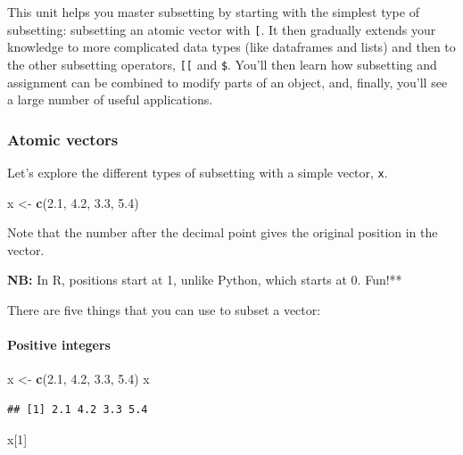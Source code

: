 \documentclass[
]{book}
\newenvironment{Shaded}{\begin{snugshade}}{\end{snugshade}}
\newcommand{\DecValTok}[1]{\textcolor[rgb]{0.00,0.00,0.81}{#1}}
\newcommand{\FloatTok}[1]{\textcolor[rgb]{0.00,0.00,0.81}{#1}}
\newcommand{\FunctionTok}[1]{\textcolor[rgb]{0.13,0.29,0.53}{\textbf{#1}}}
\newcommand{\NormalTok}[1]{#1}
\newcommand{\OtherTok}[1]{\textcolor[rgb]{0.56,0.35,0.01}{#1}}
\begin{document}
This unit helps you master subsetting by starting with the simplest type of subsetting: subsetting an atomic vector with \texttt{{[}}. It then gradually extends your knowledge to more complicated data types (like dataframes and lists) and then to the other subsetting operators, \texttt{{[}{[}} and \texttt{\$}. You'll then learn how subsetting and assignment can be combined to modify parts of an object, and, finally, you'll see a large number of useful applications.

\subsubsection{Atomic vectors}\label{atomic-vectors}

Let's explore the different types of subsetting with a simple vector, \texttt{x}.

\begin{Shaded}
\begin{Highlighting}[]
\NormalTok{x }\OtherTok{\textless{}{-}} \FunctionTok{c}\NormalTok{(}\FloatTok{2.1}\NormalTok{, }\FloatTok{4.2}\NormalTok{, }\FloatTok{3.3}\NormalTok{, }\FloatTok{5.4}\NormalTok{)}
\end{Highlighting}
\end{Shaded}

Note that the number after the decimal point gives the original position in the vector.

\textbf{NB:} In R, positions start at 1, unlike Python, which starts at 0. Fun!**

There are five things that you can use to subset a vector:

\paragraph{Positive integers}\label{positive-integers}

\begin{Shaded}
\begin{Highlighting}[]
\NormalTok{x }\OtherTok{\textless{}{-}} \FunctionTok{c}\NormalTok{(}\FloatTok{2.1}\NormalTok{, }\FloatTok{4.2}\NormalTok{, }\FloatTok{3.3}\NormalTok{, }\FloatTok{5.4}\NormalTok{)}
\NormalTok{x}
\end{Highlighting}
\end{Shaded}

\begin{verbatim}
## [1] 2.1 4.2 3.3 5.4
\end{verbatim}

\begin{Shaded}
\begin{Highlighting}[]
\NormalTok{x[}\DecValTok{1}\NormalTok{]}
\end{Highlighting}
\end{Shaded}
\end{document}
